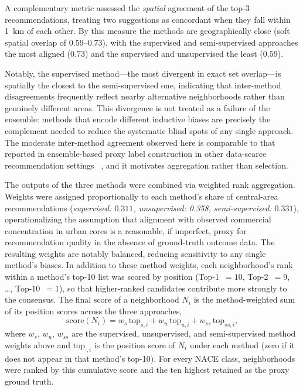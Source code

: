 \documentclass[pdflatex,sn-mathphys-num]{sn-jnl}%
\theoremstyle{thmstyleone}%
\theoremstyle{thmstyletwo}%
\theoremstyle{thmstylethree}%
\begin{document}
A complementary metric assessed the \emph{spatial} agreement of the top-3 recommendations, treating two suggestions as concordant when they fall within 1~km of each other. By this measure the methods are geographically close (soft spatial overlap of $0.59$--$0.73$), with the supervised and semi-supervised approaches the most aligned ($0.73$) and the supervised and unsupervised the least ($0.59$). 

Notably, the supervised method---the most divergent in exact set overlap---is spatially the closest to the semi-supervised one, indicating that inter-method disagreements frequently reflect nearby alternative neighborhoods rather than genuinely different areas. This divergence is not treated as a failure of the ensemble: methods that encode different inductive biases are precisely the complement needed to reduce the systematic blind spots of any single approach. The moderate inter-method agreement observed here is comparable to that reported in ensemble-based proxy label construction in other data-scarce recommendation settings ~\cite{ratner2017}, and it motivates aggregation rather than selection.

The outputs of the three methods were combined via weighted rank aggregation. Weights were assigned proportionally to each method's share of central-area recommendations (\emph{supervised: $0.311$, unsupervised: 0.358, semi-supervised: $0.331$}), operationalizing the assumption that alignment with observed commercial concentration in urban cores is a reasonable, if imperfect, proxy for recommendation quality in the absence of ground-truth outcome data. The resulting weights are notably balanced, reducing sensitivity to any single method's biases. In addition to these method weights, each neighborhood's rank within a method's top-10 list was scored by position (Top-1~$=10$, Top-2~$=9$, \ldots, Top-10~$=1$), so that higher-ranked candidates contribute more strongly to the consensus. The final score of a neighborhood $N_i$ is the method-weighted sum of its position scores across the three approaches,
\begin{equation}
    \mathrm{score}(N_i) = w_s\,\mathrm{top}_{s,i} + w_u\,\mathrm{top}_{u,i} + w_{ss}\,\mathrm{top}_{ss,i},
    \label{eq:proxy_score}
\end{equation}
where $w_s$, $w_u$, $w_{ss}$ are the supervised, unsupervised, and semi-supervised method weights above and $\mathrm{top}_{\cdot,i}$ is the position score of $N_i$ under each method (zero if it does not appear in that method's top-10). For every NACE class, neighborhoods were ranked by this cumulative score and the ten highest retained as the proxy ground truth.
\end{document}
